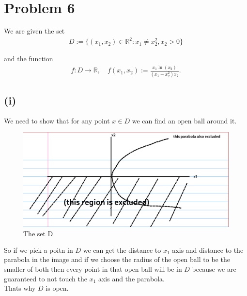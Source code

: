 \documentclass{article}
\begin{document}
\section*{Problem 6}
We are given the set
\begin{align*}
   D := \{(x_1, x_2) \in \mathbb{R}^2 : x_1 \neq x_2^2, x_2 > 0\}
\end{align*}

and the function
\begin{align*}
   f : D \to \mathbb{R}, \quad f(x_1, x_2) := \frac{x_1 \ln(x_2)}{(x_1 - x_2^2)x_2}.
\end{align*}

\subsection*{(i)}
We need to show that for any point \(x \in D\) we can find an open ball around it. \\

\begin{figure}[h!]
  \centering
  \includegraphics[width=\linewidth]{Screenshot From 2025-10-22 12-07-40.png}
  \caption{The set D}
\end{figure}

So if we pick a poitn in \(D\) we can get the distance to \(x_1\) axis and distance to the parabola in the image and if we choose the radius of the open ball to be
the smaller of both then every point in that open ball will be in \(D\) because we are guaranteed to not touch the \(x_1\) axis and the parabola. \\
Thats why \(D\) is open.
\end{document}
